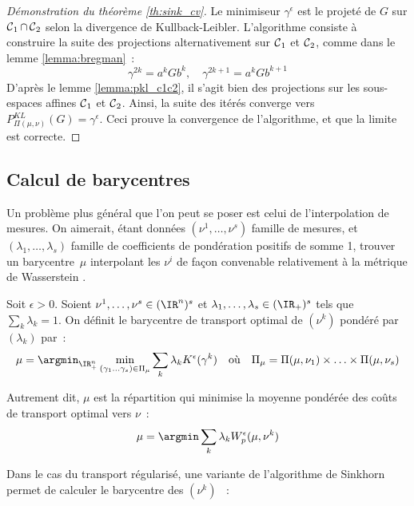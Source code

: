 \begin{proof}[Démonstration du théorème \ref{th:sink_cv}]
Le minimiseur $\gamma^\epsilon$ est le projeté de $G$ sur $\operatorname{\mathcal{C}}_1 \cap \operatorname{\mathcal{C}}_2$ selon la divergence de Kullback-Leibler. L'algorithme consiste à construire la suite des projections alternativement sur $\operatorname{\mathcal{C}}_1$ et $\operatorname{\mathcal{C}}_2$, comme dans le lemme \ref{lemma:bregman}~:
\[\gamma^{2k} = a^k G b^k,\quad \gamma^{2k+1} = a^k G b^{k+1}\]
D'après le lemme \ref{lemma:pkl_c1c2}, il s'agit bien des projections sur les sous-espaces affines $\operatorname{\mathcal{C}}_1$ et $\operatorname{\mathcal{C}}_2$.
 Ainsi, la suite des itérés converge vers $P^{KL}_{\Pi(\mu,\nu)}(G) = \gamma^\epsilon$. Ceci prouve la convergence de l'algorithme, et que la limite est correcte.
\end{proof}

\subsection{Calcul de barycentres}
Un problème plus général que l'on peut se poser est celui de l'interpolation de mesures. On aimerait, étant données $(\nu^1, \ldots, \nu^s)$ famille de mesures, et $(\lambda_1, \ldots, \lambda_s)$ famille de coefficients de pondération positifs de somme 1, trouver un \og barycentre \fg $\,\mu$ interpolant les $\nu^i$ de façon convenable relativement à la métrique de Wasserstein \cite{agueh11}.

\begin{definition}
Soit $\epsilon > 0$. Soient $\nu^1, \ldots, \nu^s \in (\IR^{n})^s$ et $\lambda_1, \ldots, \lambda_s \in (\IR_+)^s$ tels que $\sum_k \lambda_k = 1$. On définit le barycentre de transport optimal de $(\nu^k)$ pondéré par $(\lambda_k)$ par~:
\[
\mu = \argmin_{\IR_{+}^{n}} \min_{(\gamma_1 \ldots \gamma_s) \in \Pi_\mu} \sum_k \lambda_k K^\epsilon(\gamma^k) 
\quad \text{où} \quad
\Pi_\mu = \Pi(\mu,\nu_1) \times \ldots \times \Pi(\mu,\nu_s)
\]
\end{definition}
Autrement dit, $\mu$ est la répartition qui minimise la moyenne pondérée des coûts de transport optimal vers $\nu$~:
\[ \mu = \argmin \sum_k \lambda_k W^\epsilon_p(\mu,\nu^k) \]

Dans le cas du transport régularisé, une variante de l'algorithme de Sinkhorn permet de calculer le barycentre des $(\nu^k)$ \cite{benamou15}~:

